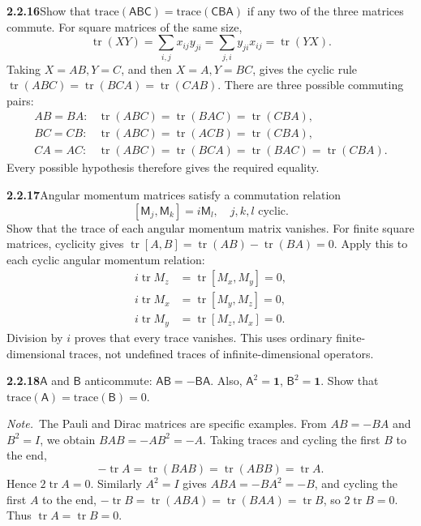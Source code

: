 \par\bigskip
\noindent\textbf{2.2.16}\quad Show that
$\mathrm{trace}(\mathsf{ABC})=\mathrm{trace}(\mathsf{CBA})$ if any two of the
three matrices commute.
\solution
For square matrices of the same size,
\[
\operatorname{tr}(XY)=\sum_{i,j}x_{ij}y_{ji}
=\sum_{j,i}y_{ji}x_{ij}=\operatorname{tr}(YX).
\]
Taking $X=AB,Y=C$, and then $X=A,Y=BC$, gives the cyclic rule
$\operatorname{tr}(ABC)=\operatorname{tr}(BCA)=\operatorname{tr}(CAB)$.
There are three possible commuting pairs:
\[
\begin{array}{ll}
AB=BA:&\operatorname{tr}(ABC)=\operatorname{tr}(BAC)
=\operatorname{tr}(CBA),\\
BC=CB:&\operatorname{tr}(ABC)=\operatorname{tr}(ACB)
=\operatorname{tr}(CBA),\\
CA=AC:&\operatorname{tr}(ABC)=\operatorname{tr}(BCA)
=\operatorname{tr}(BAC)=\operatorname{tr}(CBA).
\end{array}
\]
Every possible hypothesis therefore gives the required equality.

\par\bigskip
\noindent\textbf{2.2.17}\quad Angular momentum matrices satisfy a commutation
relation
\[
[\mathsf{M}_{j},\mathsf{M}_{k}]=i\mathsf{M}_{l},\quad j,k,l\text{ cyclic}.
\]
Show that the trace of each angular momentum matrix vanishes.
\solution
For finite square matrices, cyclicity gives
$\operatorname{tr}[A,B]=\operatorname{tr}(AB)-\operatorname{tr}(BA)=0$.
Apply this to each cyclic angular momentum relation:
\[
\begin{aligned}
i\operatorname{tr}M_z&=\operatorname{tr}[M_x,M_y]=0,\\
i\operatorname{tr}M_x&=\operatorname{tr}[M_y,M_z]=0,\\
i\operatorname{tr}M_y&=\operatorname{tr}[M_z,M_x]=0.
\end{aligned}
\]
Division by $i$ proves that every trace vanishes. This uses ordinary
finite-dimensional traces, not undefined traces of infinite-dimensional
operators.

\par\bigskip
\noindent\textbf{2.2.18}\quad $\mathsf{A}$ and $\mathsf{B}$ anticommute:
$\mathsf{AB}=-\mathsf{BA}$. Also, $\mathsf{A}^{2}=\mathbf{1}$,
$\mathsf{B}^{2}=\mathbf{1}$. Show that
$\mathrm{trace}(\mathsf{A})=\mathrm{trace}(\mathsf{B})=0$.

\emph{Note.}~The Pauli and Dirac matrices are specific examples.
\solution
From $AB=-BA$ and $B^2=I$, we obtain $BAB=-AB^2=-A$.
Taking traces and cycling the first $B$ to the end,
\[
-\operatorname{tr}A=\operatorname{tr}(BAB)
=\operatorname{tr}(ABB)=\operatorname{tr}A.
\]
Hence $2\operatorname{tr}A=0$.
Similarly $A^2=I$ gives $ABA=-BA^2=-B$, and cycling the first $A$
to the end,
$-\operatorname{tr}B=\operatorname{tr}(ABA)=\operatorname{tr}(BAA)
=\operatorname{tr}B$, so $2\operatorname{tr}B=0$.
Thus $\boxed{\operatorname{tr}A=\operatorname{tr}B=0}$.

